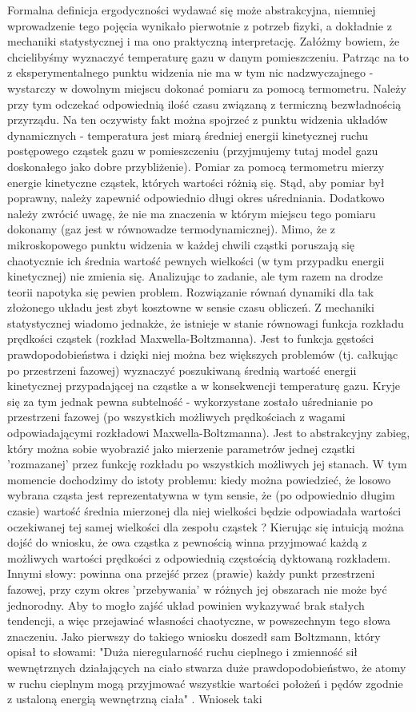 \documentclass[12pt, twoside]{book}
\begin{document}
Formalna definicja ergodyczności wydawać się może abstrakcyjna, niemniej wprowadzenie tego pojęcia wynikało pierwotnie z potrzeb fizyki, a dokładnie z mechaniki statystycznej i ma ono praktyczną interpretację. Załóżmy bowiem, że chcielibyśmy wyznaczyć temperaturę gazu w danym pomieszczeniu. Patrząc na to z eksperymentalnego punktu widzenia nie ma w tym nic nadzwyczajnego - wystarczy w dowolnym miejscu dokonać pomiaru za pomocą termometru. Należy przy tym odczekać odpowiednią ilość czasu związaną z termiczną bezwładnością przyrządu. Na ten oczywisty fakt można spojrzeć z punktu widzenia układów dynamicznych - temperatura jest miarą średniej energii kinetycznej ruchu postępowego cząstek gazu w pomieszczeniu (przyjmujemy tutaj model gazu doskonałego jako dobre przybliżenie). Pomiar za pomocą termometru mierzy energie kinetyczne cząstek, których wartości różnią się. Stąd, aby pomiar był poprawny, należy zapewnić odpowiednio długi okres uśredniania. Dodatkowo należy zwrócić uwagę, że nie ma znaczenia w którym miejscu tego pomiaru dokonamy (gaz jest w równowadze termodynamicznej). Mimo, że z mikroskopowego punktu widzenia w każdej chwili cząstki poruszają się chaotycznie ich średnia wartość pewnych wielkości (w tym przypadku energii kinetycznej) nie zmienia się. Analizując to zadanie, ale tym razem na drodze teorii napotyka się pewien problem. Rozwiązanie równań dynamiki dla tak złożonego układu jest zbyt kosztowne w sensie czasu obliczeń. Z mechaniki statystycznej wiadomo jednakże, że istnieje w stanie równowagi funkcja rozkładu prędkości cząstek (rozkład Maxwella-Boltzmanna). Jest to funkcja gęstości prawdopodobieństwa i dzięki niej można bez większych problemów (tj. całkując po przestrzeni fazowej) wyznaczyć poszukiwaną średnią wartość energii kinetycznej przypadającej na cząstke a w konsekwencji temperaturę gazu. Kryje się za tym jednak pewna subtelność - wykorzystane zostało uśrednianie po przestrzeni fazowej (po wszystkich możliwych prędkościach z wagami odpowiadającymi rozkładowi  Maxwella-Boltzmanna). Jest to abstrakcyjny zabieg, który można sobie wyobrazić jako mierzenie parametrów jednej cząstki 'rozmazanej' przez funkcję rozkładu po wszystkich możliwych jej stanach. W tym momencie dochodzimy do istoty problemu: kiedy można powiedzieć, że losowo wybrana cząsta jest reprezentatywna w tym sensie, że (po odpowiednio długim czasie) wartość średnia mierzonej dla niej wielkości będzie odpowiadała wartości oczekiwanej tej samej wielkości dla zespołu cząstek ? Kierując się intuicją można dojść do wniosku, że owa cząstka z pewnością winna przyjmować każdą z możliwych wartości prędkości z odpowiednią częstością dyktowaną rozkładem. Innymi słowy: powinna ona przejść przez (prawie) każdy punkt przestrzeni fazowej, przy czym okres 'przebywania' w różnych jej obszarach nie może być jednorodny. Aby to mogło zajść układ powinien wykazywać brak stałych tendencji, a więc przejawiać własności chaotyczne, w powszechnym tego słowa znaczeniu. Jako pierwszy do takiego wniosku doszedł sam Boltzmann, który opisał to słowami: "Duża nieregularność ruchu cieplnego i zmienność sił wewnętrznych działających na ciało stwarza duże prawdopodobieństwo, że atomy w ruchu cieplnym mogą przyjmować wszystkie wartości położeń i pędów zgodnie z ustaloną energią wewnętrzną ciała" \cite{Tempczyk}. Wniosek taki 
\end{document}
